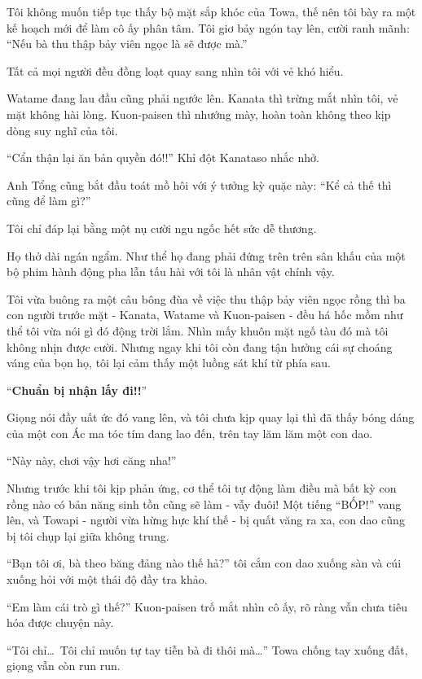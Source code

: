 \documentclass[../main.tex]{subfiles}
\begin{document}
Tôi không muốn tiếp tục thấy bộ mặt sắp khóc của Towa, thế nên tôi bày ra một kế hoạch mới để làm cô ấy phân tâm. Tôi giơ bảy ngón tay lên, cười ranh mãnh: ``Nếu bà thu thập bảy viên ngọc là sẽ được mà.''

Tất cả mọi người đều đồng loạt quay sang nhìn tôi với vẻ khó hiểu.

Watame đang lau đầu cũng phải ngước lên. Kanata thì trừng mắt nhìn tôi, vẻ mặt không hài lòng. Kuon-paisen thì nhướng mày, hoàn toàn không theo kịp dòng suy nghĩ của tôi.

``Cẩn thận lại ăn bản quyền đó!!'' Khỉ đột Kanataso nhắc nhở.

Anh Tổng cũng bắt đầu toát mồ hôi với ý tưởng kỳ quặc này: ``Kể cả thế thì cũng để làm gì?''

Tôi chỉ đáp lại bằng một nụ cười ngu ngốc hết sức dễ thương.

Họ thở dài ngán ngẩm. Như thể họ đang phải đứng trên trên sân khấu của một bộ phim hành động pha lẫn tấu hài với tôi là nhân vật chính vậy.

Tôi vừa buông ra một câu bông đùa về việc thu thập bảy viên ngọc rồng thì ba con người trước mặt - Kanata, Watame và Kuon-paisen - đều há hốc mồm như thể tôi vừa nói gì đó động trời lắm. Nhìn mấy khuôn mặt ngố tàu đó mà tôi không nhịn được cười. Nhưng ngay khi tôi còn đang tận hưởng cái sự choáng váng của bọn họ, tôi lại cảm thấy một luồng sát khí từ phía sau.

``\textbf{Chuẩn bị nhận lấy đi!!}''


Giọng nói đầy uất ức đó vang lên, và tôi chưa kịp quay lại thì đã thấy bóng dáng của một con Ác ma tóc tím đang lao đến, trên tay lăm lăm một con dao.

``Này này, chơi vậy hơi căng nha!''

Nhưng trước khi tôi kịp phản ứng, cơ thể tôi tự động làm điều mà bất kỳ con rồng nào có bản năng sinh tồn cũng sẽ làm - vẫy đuôi! Một tiếng ``BỐP!'' vang lên, và Towapi - người vừa hừng hực khí thế - bị quất văng ra xa, con dao cũng bị tôi chụp lại giữa không trung.

``Bạn tôi ơi, bà theo băng đảng nào thế hả?'' tôi cắm con dao xuống sàn và cúi xuống hỏi với một thái độ đầy tra khảo.

``Em làm cái trò gì thế?'' Kuon-paisen trố mắt nhìn cô ấy, rõ ràng vẫn chưa tiêu hóa được chuyện này.

``Tôi chỉ\dots\ Tôi chỉ muốn tự tay tiễn bà đi thôi mà\dots'' Towa chống tay xuống đất, giọng vẫn còn run run.
\end{document}
